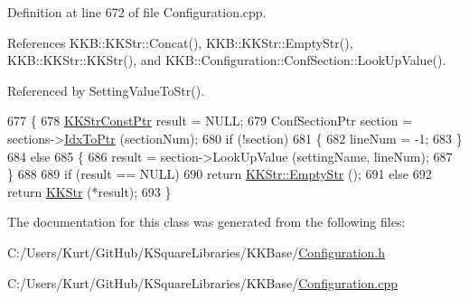 Definition at line 672 of file Configuration.\+cpp.



References K\+K\+B\+::\+K\+K\+Str\+::\+Concat(), K\+K\+B\+::\+K\+K\+Str\+::\+Empty\+Str(), K\+K\+B\+::\+K\+K\+Str\+::\+K\+K\+Str(), and K\+K\+B\+::\+Configuration\+::\+Conf\+Section\+::\+Look\+Up\+Value().



Referenced by Setting\+Value\+To\+Str().


\begin{DoxyCode}
677 \{
678   \hyperlink{class_k_k_b_1_1_k_k_str}{KKStrConstPtr}  result = NULL;
679   ConfSectionPtr  section = sections->\hyperlink{class_k_k_b_1_1_k_k_queue_acce2bdd8b3327e38266cf198382cd852}{IdxToPtr} (sectionNum);
680   \textcolor{keywordflow}{if}  (!section)
681   \{
682     lineNum = -1;
683   \}
684   \textcolor{keywordflow}{else}
685   \{
686     result = section->LookUpValue (settingName, lineNum);
687   \}
688 
689   \textcolor{keywordflow}{if}  (result == NULL)
690     \textcolor{keywordflow}{return} \hyperlink{class_k_k_b_1_1_k_k_str_ab6e416b3ef54ef632bd10c3f7a2f7994}{KKStr::EmptyStr} ();
691   \textcolor{keywordflow}{else}
692     \textcolor{keywordflow}{return} \hyperlink{class_k_k_b_1_1_k_k_str}{KKStr} (*result);
693 \}
\end{DoxyCode}


The documentation for this class was generated from the following files\+:\begin{DoxyCompactItemize}
\item 
C\+:/\+Users/\+Kurt/\+Git\+Hub/\+K\+Square\+Libraries/\+K\+K\+Base/\hyperlink{_configuration_8h}{Configuration.\+h}\item 
C\+:/\+Users/\+Kurt/\+Git\+Hub/\+K\+Square\+Libraries/\+K\+K\+Base/\hyperlink{_configuration_8cpp}{Configuration.\+cpp}\end{DoxyCompactItemize}
